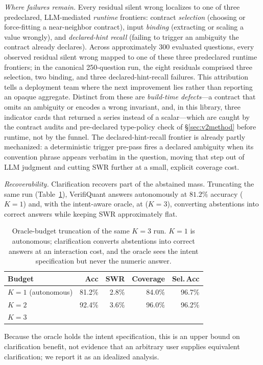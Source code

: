 \emph{Where failures remain.}
Every residual silent wrong localizes to one of three predeclared, LLM-mediated \emph{runtime} frontiers: contract \emph{selection} (choosing or force-fitting a near-neighbor contract), input \emph{binding} (extracting or scaling a value wrongly), and \emph{declared-hint recall} (failing to trigger an ambiguity the contract already declares).
Across approximately 300 evaluated questions, every observed residual silent wrong mapped to one of these three predeclared runtime frontiers; in the canonical 250-question run, the eight residuals comprised three selection, two binding, and three declared-hint-recall failures.
This attribution tells a deployment team where the next improvement lies rather than reporting an opaque aggregate.
Distinct from these are \emph{build-time defects}---a contract that omits an ambiguity or encodes a wrong invariant, and, in this library, three indicator cards that returned a series instead of a scalar---which are caught by the contract audits and pre-declared type-policy check of \S\ref{sec:v2method} before runtime, not by the funnel.
The declared-hint-recall frontier is already partly mechanized: a deterministic trigger pre-pass fires a declared ambiguity when its convention phrase appears verbatim in the question, moving that step out of LLM judgment and cutting SWR further at a small, explicit coverage cost.

\emph{Recoverability.}
Clarification recovers part of the abstained mass.
Truncating the same run (Table~\ref{tab:v2kabl}), VerifiQuant answers autonomously at $81.2\%$ accuracy ($K{=}1$) and, with the intent-aware oracle, at \vqAccAll{} ($K{=}3$), converting abstentions into correct answers while keeping SWR approximately flat.

\begin{table}[t]
\caption{Oracle-budget truncation of the same $K{=}3$ run.
$K{=}1$ is autonomous; clarification converts abstentions into correct answers at an interaction cost, and the oracle sees the intent specification but never the numeric answer.}
\label{tab:v2kabl}
\small
\begin{tabular}{@{}lrrrr@{}}
\toprule
Budget & Acc & SWR & Coverage & Sel.\,Acc \\
\midrule
$K{=}1$ (autonomous) & 81.2\% & 2.8\% & 84.0\% & 96.7\% \\
$K{=}2$ & 92.4\% & 3.6\% & 96.0\% & 96.2\% \\
$K{=}3$ & \vqAccAll{} & \vqSWRAll{} & \vqCovAll{} & \vqSelAccAll{} \\
\bottomrule
\end{tabular}
\end{table}
Because the oracle holds the intent specification, this is an upper bound on clarification benefit, not evidence that an arbitrary user supplies equivalent clarification; we report it as an idealized analysis.

